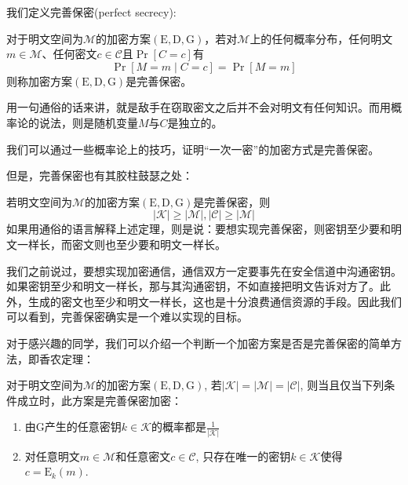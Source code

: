 \documentclass[UTF8]{ctexrep}
\newcommand{\ext}{\displaystyle}
\def\abs#1{\left| #1 \right|}
\def\pth#1{\left( {#1}\right)}
\def\brack#1{\left[ {#1}\right]}
\def\E#1#2{{\mathrm{E}_{#1}\left({#2}\right)}}
\begin{document}
我们定义完善保密(perfect secrecy):\par
对于明文空间为$\mathcal{M}$的加密方案$\pth{\mathrm{E}, \mathrm{D}, \mathrm{G}}$，若对$\mathcal{M}$上的任何概率分布，任何明文$m\in\mathcal{M}$、任何密文$c\in\mathcal{C}$且$\Pr\brack{C=c}$有
\begin{equation}
    \Pr\brack{M=m\mid C=c}=\Pr\brack{M=m}
\end{equation}
则称加密方案$\pth{\mathrm{E}, \mathrm{D}, \mathrm{G}}$是完善保密。\par
用一句通俗的话来讲，就是敌手在窃取密文之后并不会对明文有任何知识。而用概率论的说法，则是随机变量$M$与$C$是独立的。\par
我们可以通过一些概率论上的技巧，证明“一次一密”的加密方式是完善保密。\par
但是，完善保密也有其胶柱鼓瑟之处：\par
若明文空间为$\mathcal{M}$的加密方案$\pth{\mathrm{E}, \mathrm{D}, \mathrm{G}}$是完善保密，则
\begin{equation}
    \abs{\mathcal{K}}\geq\abs{\mathcal{M}}, \abs{\mathcal{C}}\geq\abs{\mathcal{M}}
\end{equation}
如果用通俗的语言解释上述定理，则是说：要想实现完善保密，则密钥至少要和明文一样长，而密文则也至少要和明文一样长。\par
我们之前说过，要想实现加密通信，通信双方一定要事先在安全信道中沟通密钥。如果密钥至少和明文一样长，那与其沟通密钥，不如直接把明文告诉对方了。此外，生成的密文也至少和明文一样长，这也是十分浪费通信资源的手段。因此我们可以看到，完善保密确实是一个难以实现的目标。\par
对于感兴趣的同学，我们可以介绍一个判断一个加密方案是否是完善保密的简单方法，即香农定理：\par
对于明文空间为$\mathcal{M}$的加密方案$\pth{\mathrm{E}, \mathrm{D}, \mathrm{G}}$, 若$\abs{\mathcal{K}} = \abs{\mathcal{M}} = \abs{\mathcal{C}}$, 则当且仅当下列条件成立时，此方案是完善保密加密：
\begin{enumerate}
    \item 由$\mathrm{G}$产生的任意密钥$k\in\mathcal{K}$的概率都是$\ext\frac{1}{\abs{\mathcal{K}}}$
    \item 对任意明文$m\in\mathcal{M}$和任意密文$c\in\mathcal{C}$, 只存在唯一的密钥$k\in\mathcal{K}$使得$c=\E{k}{m}$.
\end{enumerate}
\end{document}

